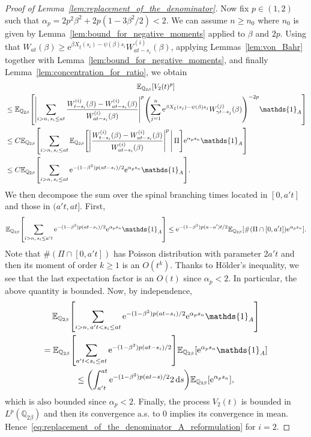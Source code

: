 \documentclass[10pt]{amsart}
\theoremstyle{definition}\newtheorem{defi}[theo]{Definition}\newtheorem{rema}[theo]{Remark}\newtheorem{exam}[theo]{Example}\newtheorem{exem}[theo]{Example}\newtheorem{nota}[theo]{Notation}
\newcommand{\e}{\mathrm{e}}
\renewcommand{\d}[1]{\mathop{}\!\mathrm{d}#1}
\newcommand{\E}{\mathbb{E}}
\newcommand{\Q}{\mathbb{Q}}
\newcommand\1{\mathds{1}}
\let\originalleft\left
\let\originalright\right
\renewcommand{\left}{\mathopen{}\mathclose\bgroup\originalleft}
\renewcommand{\right}{\aftergroup\egroup\originalright}
\begin{document}
\begin{proof}[Proof of Lemma~\ref{lem:replacement_of_the_denominator}]
\pagebreak
Now fix $p \in (1, 2)$ such that $\alpha_p = 2p^2\beta^2 + 2p(1 - 3\beta^2/2) < 2$. We can assume $n \geq n_0$ where $n_0$ is given by Lemma~\ref{lem:bound_for_negative_moments} applied to $\beta$ and $2p$. Using that $W_{at}(\beta) \geq \e^{\beta X_\xi(s_i) - \psi(\beta)s_i} W_{at - s_i}^{(i)}(\beta)$, applying Lemmas~\ref{lem:von_Bahr} together with Lemma~\ref{lem:bound_for_negative_moments}, and finally Lemma~\ref{lem:concentration_for_ratio}, we obtain
\begin{multline*}
 \E_{\Q_{2 \beta}} \left[V_2(t)^p \right]  \\
\begin{aligned}
&\leq \E_{\Q_{2 \beta}} \left[\left| \sum_{{i > n,\, s_i \leq at}} \frac{W_{t - s_i}^{(i)}(\beta) - W_{at - s_i}^{(i)}(\beta)}{W_{at - s_i}^{(i)}(\beta)} \right|^p \left(\sum_{j = 1}^n \e^{\beta X_\xi(s_j) - \psi(\beta)s_j} W_{\gamma t - s_j}^{(j)}(\beta) \right)^{-2p} \1_A \right]  \\
&\leq C \E_{\Q_{2 \beta}} \left[\sum_{{i > n,\, s_i \leq at}} \E_{\Q_{2 \beta}} \left[\left| \frac{W_{t - s_i}^{(i)}(\beta) - W_{at - s_i}^{(i)}(\beta)}{W_{at - s_i}^{(i)}(\beta)} \right|^p \,\middle|\, \Pi \right] \e^{\alpha_p s_n} \1_A \right]  \\
&\leq C \E_{\Q_{2 \beta}} \left[\sum_{i > n,\, s_i \leq at} \e^{-(1 - \beta^2)p(at - s_i)/2} \e^{\alpha_p s_n} \1_A \right]. 
\end{aligned}
\end{multline*}
We then decompose the sum over the spinal branching times located in $[0, a't]$ and those in $(a't, at]$. First,
\begin{equation*}
\E_{\Q_{2 \beta}} \left[\sum_{{i > n,\, s_i \leq a't}} \e^{-(1 - \beta^2)p(at - s_i)/2} \e^{\alpha_p s_n} \1_A \right] \leq \e^{-(1 - \beta^2)p(a - a')t/2} \E_{\Q_{2 \beta}} \left[\#(\Pi \cap [0, a't]) \e^{\alpha_p s_n} \right].
\end{equation*}
Note that $\#(\Pi \cap [0, a't])$ has Poisson distribution with parameter $2a't$ and then its moment of order $k \geq 1$ is an $O(t^k)$. Thanks to H\"older's inequality, we see that the last expectation factor is an $O(t)$ since $\alpha_p < 2$. In particular, the above quantity is bounded. Now, by independence,
\begin{multline*}
\E_{\Q_{2 \beta}} \left[\sum_{i > n,\, a't < s_i \leq at} \e^{-(1 - \beta^2)p(at - s_i)/2} \e^{\alpha_p s_n} \1_A \right]  \\
= \E_{\Q_{2 \beta}} \left[\sum_{a't < s_i \leq at} \e^{-(1 - \beta^2)p(at - s_i)/2} \right] \E_{\Q_{2 \beta}} \left[\e^{\alpha_p s_n} \1_A \right]  \\
\leq \left(\int_{a't}^{at} \e^{-(1 - \beta^2)p(at - s)/2} 2\d{s} \right) \E_{\Q_{2 \beta}} \left[\e^{\alpha_p s_n} \right], 
\end{multline*}
which is also bounded since $\alpha_p < 2$. Finally, the process $V_2(t)$ is bounded in $L^p(\Q_{2\beta})$ and then its convergence a.s. to $0$ implies its convergence in mean. Hence~\eqref{eq:replacement_of_the_denominator_A_reformulation} for $i = 2$.


\end{proof}
\end{document}
